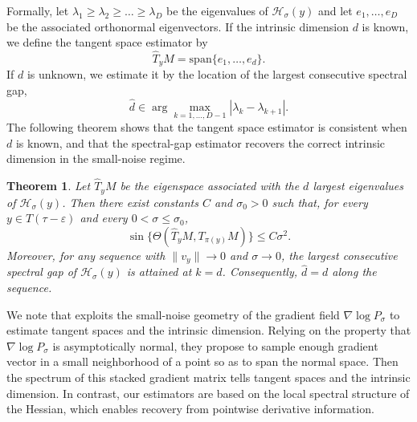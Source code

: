 \documentclass[11pt]{article}
\theoremstyle{plain}
\newtheorem{theorem}{Theorem}[section]
\theoremstyle{definition}
\begin{document}
Formally, let $\lambda_1 \geq \lambda_2 \geq \dots \geq \lambda_D$ be the eigenvalues of $\mathcal{H}_\sigma(y)$ and let $e_1,\dots,e_D$ be the associated orthonormal eigenvectors. If the intrinsic dimension $d$ is known, we define the tangent space estimator by
\[
\widehat{T}_{y}M = \mathrm{span}\{e_1,\dots,e_d\}.
\]
If $d$ is unknown, we estimate it by the location of the largest consecutive spectral gap,
\[
\widehat{d} \in \arg\max_{k=1,\dots,D-1} |\lambda_k - \lambda_{k+1}|.
\]
The following theorem shows that the tangent space estimator is consistent when $d$ is known, and that the spectral-gap estimator recovers the correct intrinsic dimension in the small-noise regime.
\begin{theorem}\label{th:tangent-space}
Let $\widehat T_yM$ be the eigenspace associated with the $d$ largest eigenvalues of $\mathcal H_\sigma(y)$. Then there exist constants $C$ and $\sigma_0>0$ such that, for every $y\in T(\tau-\varepsilon)$ and every $0<\sigma\le\sigma_0$,
\[
\sin\{\Theta(\widehat{T}_{y}M,T_{\pi(y)}M)\} \le C\sigma^2.
\]
Moreover, for any sequence with $\|v_y\|\to0$ and $\sigma\to0$, the largest consecutive spectral gap of $\mathcal H_\sigma(y)$ is attained at $k=d$. Consequently, $\widehat d=d$ along the sequence.
\end{theorem}
We note that \citet{Stanczuk2024} exploits the small-noise geometry of the gradient field $\nabla \log P_\sigma$ to estimate tangent spaces and the intrinsic dimension. Relying on the property that $\nabla \log P_\sigma$ is asymptotically normal, they propose to sample enough gradient vector in a small neighborhood of a point so as to span the normal space. Then the spectrum of this stacked gradient matrix tells tangent spaces and the intrinsic dimension.
In contrast, our estimators are based on the local spectral structure of the Hessian, which enables recovery from pointwise derivative information.
\end{document}

